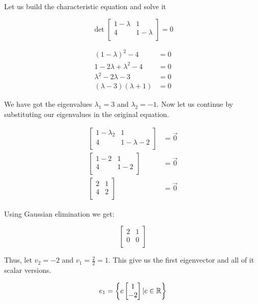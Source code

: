 Let us build the characteristic equation and solve it

\[
    \det 
    \begin{bmatrix}
        1 - \lambda & 1 \\
        4 & 1 - \lambda \\
    \end{bmatrix}
    = 0
\]

\begin{align*}
    (1 - \lambda)^2 - 4 &= 0 \\
    1 - 2\lambda + \lambda^2 - 4 &= 0 \\
    \lambda^2 - 2\lambda - 3 &= 0 \\
    (\lambda - 3) (\lambda + 1) &= 0 
\end{align*}

We have got the eigenvalues \(\lambda_1 = 3\) and \(\lambda_2 = -1\). Now let us continue by 
substituting our eigenvalues in the original equation.

\begin{align*}
    \begin{bmatrix} 1 - \lambda_2 & 1 \\ 4 & 1 - \lambda-2 \\ \end{bmatrix} &= \vec{0} \\
    \begin{bmatrix} 1 - 2 & 1 \\ 4 & 1 - 2 \\ \end{bmatrix} &= \vec{0} \\
    \begin{bmatrix} 2 & 1 \\ 4 & 2 \\ \end{bmatrix} &= \vec{0} 
\end{align*}

Using Gaussian elimination we get: 

\[
    \begin{bmatrix} 
        2 & 1 \\ 
        0 & 0 \\ 
    \end{bmatrix} 
\]

Thus, let \(v_2 = -2\) and \(v_1 = \frac{2}{2} = 1\). This give us the first eigenvector and all of it 
scalar versions.

\[
    e_1 = \left\{ c \begin{bmatrix} 1 \\ -2 \end{bmatrix} | c \in \mathbb{R}\right\}
\]

